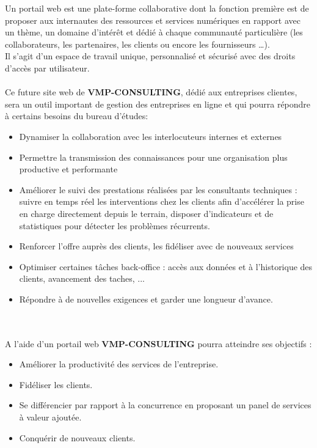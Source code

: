\documentclass[12pt]{article}
\begin{document}
Un portail web est une plate-forme collaborative dont la fonction première est de proposer aux internautes des ressources et services numériques en rapport avec un thème, un domaine d’intérêt et dédié à chaque communauté particulière (les collaborateurs, les partenaires, les clients ou encore les fournisseurs …). \\
Il s’agit d’un espace de travail unique, personnalisé et sécurisé avec des droits d’accès par utilisateur.\\ \\


Ce future site web de \textbf{VMP-CONSULTING}, dédié aux entreprises clientes, sera un outil important
 de gestion des entreprises en ligne et qui pourra répondre à certains besoins du bureau d'études:
\begin{itemize}

\item  Dynamiser la collaboration avec les interlocuteurs internes et externes
 \item   Permettre la transmission des connaissances pour une organisation plus productive et performante
 \item     Améliorer le suivi des prestations réalisées par les consultants techniques : suivre en temps réel les interventions chez les clients afin d’accélérer la prise en charge directement depuis le terrain, disposer d’indicateurs et de statistiques pour détecter les problèmes récurrents.
 
 \item   Renforcer  l'offre auprès des clients, les fidéliser avec de nouveaux services
 \item   Optimiser certaines tâches back-office : accès aux données et à l’historique des  clients, avancement des taches, ...
\item    Répondre à de nouvelles exigences et garder une longueur d’avance.

\end{itemize}

\\ \\

A l'aide d'un portail web  \textbf{VMP-CONSULTING} pourra atteindre ses objectifs :

\begin{itemize}

\item Améliorer la productivité des services de l'entreprise.
\item Fidéliser les clients.
\item Se différencier par rapport à la concurrence en proposant un panel de services à
valeur ajoutée.
\item Conquérir de nouveaux clients.
\end{itemize}
\end{document}
